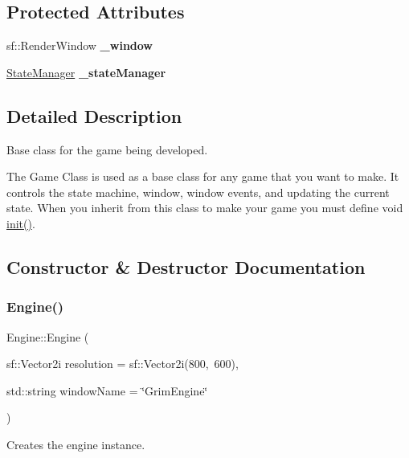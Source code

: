 \subsection*{Protected Attributes}
\begin{DoxyCompactItemize}
\item 
\mbox{\label{class_engine_afd93e6a52301e792650f99043f113cbf}} 
sf\+::\+Render\+Window {\bfseries \+\_\+window}
\item 
\mbox{\label{class_engine_ad300faec8af13f1e98cdadc0012f340c}} 
\mbox{\hyperlink{class_state_manager}{State\+Manager}} {\bfseries \+\_\+state\+Manager}
\end{DoxyCompactItemize}


\subsection{Detailed Description}
Base class for the game being developed. 

The Game Class is used as a base class for any game that you want to make. It controls the state machine, window, window events, and updating the current state. When you inherit from this class to make your game you must define void \mbox{\hyperlink{class_engine_a5e3e4141993d989312f37bde74e8ba2f}{init()}}. 

\subsection{Constructor \& Destructor Documentation}
\mbox{\label{class_engine_afd8c14897778d2d75aac12478c14c9dd}} 
\subsubsection{\texorpdfstring{Engine()}{Engine()}}
{\footnotesize\ttfamily Engine\+::\+Engine (\begin{DoxyParamCaption}\item[{sf\+::\+Vector2i}]{resolution = {\ttfamily sf\+:\+:Vector2i(800,~600)},  }\item[{std\+::string}]{window\+Name = {\ttfamily \char`\"{}GrimEngine\char`\"{}} }\end{DoxyParamCaption})}



Creates the engine instance. 


